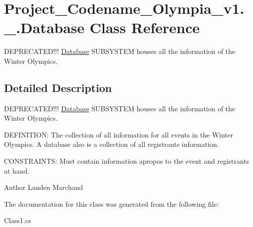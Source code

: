 \hypertarget{classProject__Codename__Olympia__v1_1_1__0_1_1Database}{}\section{Project\+\_\+\+Codename\+\_\+\+Olympia\+\_\+v1.\+\_.\+Database Class Reference}
\label{classProject__Codename__Olympia__v1_1_1__0_1_1Database}


D\+E\+P\+R\+E\+C\+A\+T\+E\+D!!! \hyperlink{classProject__Codename__Olympia__v1_1_1__0_1_1Database}{Database} S\+U\+B\+S\+Y\+S\+T\+EM houses all the information of the Winter Olympics.  




\subsection{Detailed Description}
D\+E\+P\+R\+E\+C\+A\+T\+E\+D!!! \hyperlink{classProject__Codename__Olympia__v1_1_1__0_1_1Database}{Database} S\+U\+B\+S\+Y\+S\+T\+EM houses all the information of the Winter Olympics. 

D\+E\+F\+I\+N\+I\+T\+I\+ON\+: The collection of all information for all events in the Winter Olympics. A database also is a collection of all registrants information.

C\+O\+N\+S\+T\+R\+A\+I\+N\+TS\+: Must contain information apropos to the event and registrants at hand.\begin{DoxyAuthor}{Author}
Landen Marchand 
\end{DoxyAuthor}


The documentation for this class was generated from the following file\+:\begin{DoxyCompactItemize}
\item 
Class1.\+cs\end{DoxyCompactItemize}

